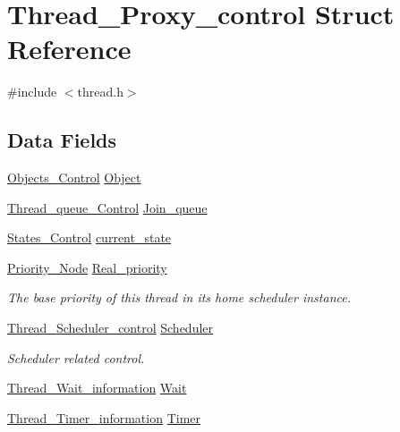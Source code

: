 \hypertarget{structThread__Proxy__control}{}\section{Thread\+\_\+\+Proxy\+\_\+control Struct Reference}
\label{structThread__Proxy__control}


{\ttfamily \#include $<$thread.\+h$>$}

\subsection*{Data Fields}
\begin{DoxyCompactItemize}
\item 
\mbox{\hyperlink{structObjects__Control}{Objects\+\_\+\+Control}} \mbox{\hyperlink{structThread__Proxy__control_a27c1eba6d174d79169af58638e173def}{Object}}
\item 
\mbox{\hyperlink{structThread__queue__Control}{Thread\+\_\+queue\+\_\+\+Control}} \mbox{\hyperlink{structThread__Proxy__control_ab9d8b4de8c315ea5999b460c4c14aada}{Join\+\_\+queue}}
\item 
\mbox{\hyperlink{group__RTEMSScoreStates_gaeebbea0bfca162709b124fd519cf99d3}{States\+\_\+\+Control}} \mbox{\hyperlink{structThread__Proxy__control_a133171ded0f076118c65455a4ec6d7b9}{current\+\_\+state}}
\item 
\mbox{\label{structThread__Proxy__control_a2d8e3f909309cdbb9e59bd361c7d76a7}} 
\mbox{\hyperlink{structPriority__Node}{Priority\+\_\+\+Node}} \mbox{\hyperlink{structThread__Proxy__control_a2d8e3f909309cdbb9e59bd361c7d76a7}{Real\+\_\+priority}}
\begin{DoxyCompactList}\small\item\em The base priority of this thread in its home scheduler instance. \end{DoxyCompactList}\item 
\mbox{\label{structThread__Proxy__control_ab5f462449bf48f53a647d70f495f1716}} 
\mbox{\hyperlink{structThread__Scheduler__control}{Thread\+\_\+\+Scheduler\+\_\+control}} \mbox{\hyperlink{structThread__Proxy__control_ab5f462449bf48f53a647d70f495f1716}{Scheduler}}
\begin{DoxyCompactList}\small\item\em Scheduler related control. \end{DoxyCompactList}\item 
\mbox{\hyperlink{structThread__Wait__information}{Thread\+\_\+\+Wait\+\_\+information}} \mbox{\hyperlink{structThread__Proxy__control_a7363a6f364d9a36986ddaf7bdc193a93}{Wait}}
\item 
\mbox{\hyperlink{structThread__Timer__information}{Thread\+\_\+\+Timer\+\_\+information}} \mbox{\hyperlink{structThread__Proxy__control_a36f44d282e1581fce2c3699f07ed7eb0}{Timer}}
\end{DoxyCompactItemize}


